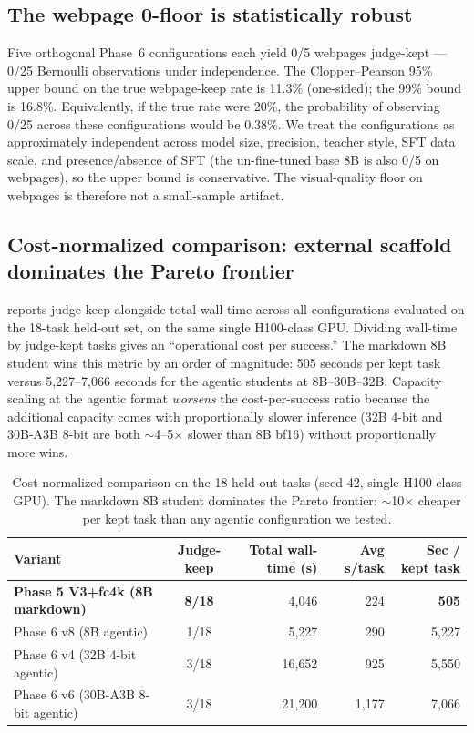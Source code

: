 \documentclass[11pt]{article}
\begin{document}
\subsection{The webpage 0-floor is statistically robust}
\label{sec:webfloor}

Five orthogonal Phase~6 configurations each yield 0/5 webpages judge-kept --- 0/25 Bernoulli observations under independence. The Clopper--Pearson 95\% upper bound on the true webpage-keep rate is 11.3\% (one-sided); the 99\% bound is 16.8\%. Equivalently, if the true rate were 20\%, the probability of observing 0/25 across these configurations would be 0.38\%. We treat the configurations as approximately independent across model size, precision, teacher style, SFT data scale, and presence/absence of SFT (the un-fine-tuned base 8B is also 0/5 on webpages), so the upper bound is conservative. The visual-quality floor on webpages is therefore not a small-sample artifact.

\subsection{Cost-normalized comparison: external scaffold dominates the Pareto frontier}

 reports judge-keep alongside total wall-time across all configurations evaluated on the 18-task held-out set, on the same single H100-class GPU. Dividing wall-time by judge-kept tasks gives an ``operational cost per success.'' The markdown 8B student wins this metric by an order of magnitude: 505 seconds per kept task versus 5{,}227--7{,}066 seconds for the agentic students at 8B--30B--32B. Capacity scaling at the agentic format \emph{worsens} the cost-per-success ratio because the additional capacity comes with proportionally slower inference (32B 4-bit and 30B-A3B 8-bit are both $\sim$4--5$\times$ slower than 8B bf16) without proportionally more wins.

\begin{table}[t]
\centering
\caption{Cost-normalized comparison on the 18 held-out tasks (seed 42, single H100-class GPU). The markdown 8B student dominates the Pareto frontier: $\sim$10$\times$ cheaper per kept task than any agentic configuration we tested.}
\label{tab:cost-pareto}
\small
\begin{tabular}{lcrrr}
\toprule
Variant & Judge-keep & Total wall-time (s) & Avg s/task & \textbf{Sec / kept task} \\
\midrule
\textbf{Phase 5 V3+fc4k (8B markdown)} & \textbf{8/18} & 4{,}046 & 224 & \textbf{505} \\
Phase 6 v8 (8B agentic) & 1/18 & 5{,}227 & 290 & 5{,}227 \\
Phase 6 v4 (32B 4-bit agentic) & 3/18 & 16{,}652 & 925 & 5{,}550 \\
Phase 6 v6 (30B-A3B 8-bit agentic) & 3/18 & 21{,}200 & 1{,}177 & 7{,}066 \\
\bottomrule
\end{tabular}
\end{table}
\end{document}
